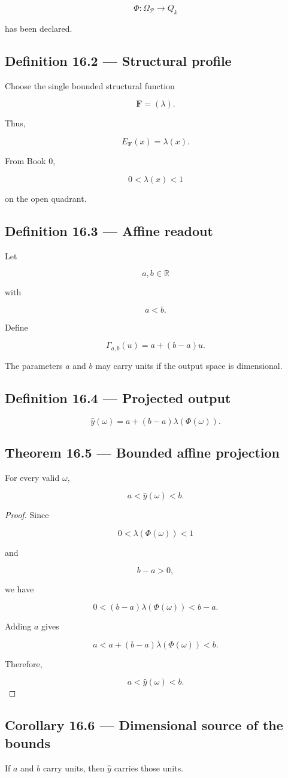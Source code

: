 \documentclass[11pt,oneside,openany]{book}
\newcommand{\PCsubsection}[1]{%
  \subsection*{#1}%
}
\begin{document}
\[
\Phi:\Omega_{\mathcal P}\to Q_k
\]

has been declared.

\PCsubsection{Definition 16.2 --- Structural profile}

Choose the single bounded structural function

\[
\mathbf F=(\lambda).
\]

Thus,

\[
E_{\mathbf F}(x)=\lambda(x).
\]

From Book 0,

\[
0<\lambda(x)<1
\]

on the open quadrant.

\PCsubsection{Definition 16.3 --- Affine readout}

Let

\[
a,b\in\mathbb R
\]

with

\[
a<b.
\]

Define

\[
\Gamma_{a,b}(u) = a+(b-a)u.
\]

The parameters \(a\) and \(b\) may carry units if the output space is dimensional.

\PCsubsection{Definition 16.4 --- Projected output}

\[
\widehat y(\omega) = a+(b-a)\lambda(\Phi(\omega)).
\]

\PCsubsection{Theorem 16.5 --- Bounded affine projection}

For every valid \(\omega\),

\[
\boxed{ a<\widehat y(\omega)<b. }
\]

\begin{proof}
Since

\[
0<\lambda(\Phi(\omega))<1
\]

and

\[
b-a>0,
\]

we have

\[
0< (b-a)\lambda(\Phi(\omega)) < b-a.
\]

Adding \(a\) gives

\[
a< a+(b-a)\lambda(\Phi(\omega)) < b.
\]

Therefore,

\[
a<\widehat y(\omega)<b.
\]

\end{proof}

\PCsubsection{Corollary 16.6 --- Dimensional source of the bounds}

If \(a\) and \(b\) carry units, then \(\widehat y\) carries those units.
\end{document}
